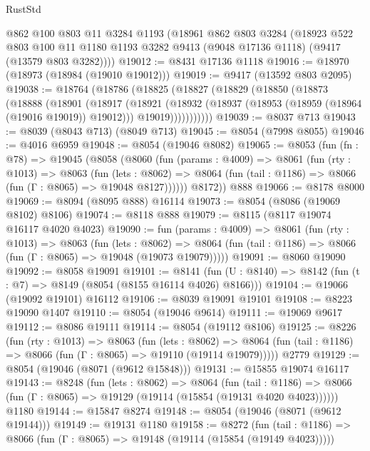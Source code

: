 \begin{lexlean}{RustStd}
\begin{coremodule}
    @862
    @100
    @803
    @11
    @3284
    @1193
    (@18961
      @862
      @803
      @3284
      (@18923
        @522
        @803
        @100
        @11
        @1180
        @1193
        @3282
        @9413
        (@9048 @17136 @1118)
        (@9417 (@13579 @803 @3282))))
@19012 := @8431 @17136 @1118
@19016 := @18970 (@18973 (@18984 (@19010 @19012)))
@19019 := @9417 (@13592 @803 @2095)
@19038 := @18764
    (@18786
      (@18825
        (@18827
          (@18829
            (@18850
              (@18873
                (@18888
                  (@18901
                    (@18917
                      (@18921
                        (@18932
                          (@18937 (@18953 (@18959 (@18964 (@19016 @19019)) @19012)))
                          @19019)))))))))))
@19039 := @8037 @713
@19043 := @8039 (@8043 @713) (@8049 @713)
@19045 := @8054 (@7998 @8055)
@19046 := @4016 @6959
@19048 := @8054 (@19046 @8082)
@19065 := @8053
    (fun (fn : @78) =>
    @19045
      (@8058
        (@8060
          (fun (params : @4009) =>
          @8061
            (fun (rty : @1013) =>
            @8063
              (fun (lets : @8062) =>
              @8064 (fun (tail : @1186) => @8066 (fun (Γ : @8065) => @19048 @8127))))))
        @8172))
    @888
@19066 := @8178 @8000
@19069 := @8094 (@8095 @888) @16114
@19073 := @8054 (@8086 (@19069 @8102) @8106)
@19074 := @8118 @888
@19079 := @8115 (@8117 @19074 @16117 @4020 @4023)
@19090 := fun (params : @4009) =>
  @8061
    (fun (rty : @1013) =>
    @8063
      (fun (lets : @8062) =>
      @8064 (fun (tail : @1186) => @8066 (fun (Γ : @8065) => @19048 (@19073 @19079)))))
@19091 := @8060 @19090
@19092 := @8058 @19091
@19101 := @8141
    (fun (U : @8140) => @8142 (fun (t : @7) => @8149 (@8054 (@8155 @16114 @4026) @8166)))
@19104 := @19066 (@19092 @19101) @16112
@19106 := @8039 @19091 @19101
@19108 := @8223 @19090 @1407
@19110 := @8054 (@19046 @9614)
@19111 := @19069 @9617
@19112 := @8086 @19111
@19114 := @8054 (@19112 @8106)
@19125 := @8226
    (fun (rty : @1013) =>
    @8063
      (fun (lets : @8062) =>
      @8064 (fun (tail : @1186) => @8066 (fun (Γ : @8065) => @19110 (@19114 @19079)))))
    @2779
@19129 := @8054 (@19046 (@8071 (@9612 @15848)))
@19131 := @15855 @19074 @16117
@19143 := @8248
    (fun (lets : @8062) =>
    @8064
      (fun (tail : @1186) =>
      @8066 (fun (Γ : @8065) => @19129 (@19114 (@15854 (@19131 @4020 @4023))))))
    @1180
@19144 := @15847 @8274
@19148 := @8054 (@19046 (@8071 (@9612 @19144)))
@19149 := @19131 @1180
@19158 := @8272
    (fun (tail : @1186) => @8066 (fun (Γ : @8065) => @19148 (@19114 (@15854 (@19149 @4023)))))

\end{coremodule}
\end{lexlean}
